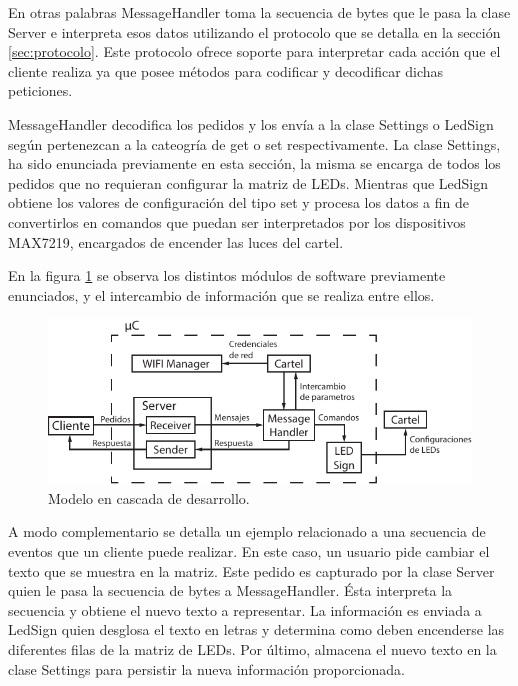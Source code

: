 En otras palabras MessageHandler toma la secuencia de bytes que le pasa la clase Server e interpreta esos datos utilizando el protocolo que se detalla en la sección \ref{sec:protocolo}.
Este protocolo ofrece soporte para interpretar cada acción que el cliente realiza ya que posee métodos para codificar y decodificar dichas peticiones.

MessageHandler decodifica los pedidos y los envía a la clase Settings o LedSign según pertenezcan a la cateogría de get o set respectivamente.
La clase Settings, ha sido enunciada previamente en esta sección, la misma se encarga de todos los pedidos que no requieran configurar la matriz de LEDs.
Mientras que LedSign obtiene los valores de configuración del tipo set y procesa los datos a fin de convertirlos en comandos que puedan ser interpretados por los dispositivos MAX7219, encargados de encender las luces del cartel.

En la figura \ref{fig:flujo_de_datos} se observa los distintos módulos de software previamente enunciados, y el intercambio de información que se realiza entre ellos.

\begin{figure}[!ht]
	\centering
	\includegraphics[width=0.8\linewidth]{imagenes/diagrama-bloque.pdf}
	\caption{Modelo en cascada de desarrollo.}
	\label{fig:flujo_de_datos}
\end{figure}

A modo complementario se detalla un ejemplo relacionado a una secuencia de eventos que un cliente puede realizar.
En este caso, un usuario pide cambiar el texto que se muestra en la matriz. Este pedido es capturado por la clase Server quien le pasa la secuencia de bytes a MessageHandler.
Ésta interpreta la secuencia y obtiene el nuevo texto a representar. La información es enviada a LedSign quien desglosa el texto en letras y determina como deben encenderse las diferentes filas de la matriz de LEDs.
Por último, almacena el nuevo texto en la clase Settings para persistir la nueva información proporcionada.

